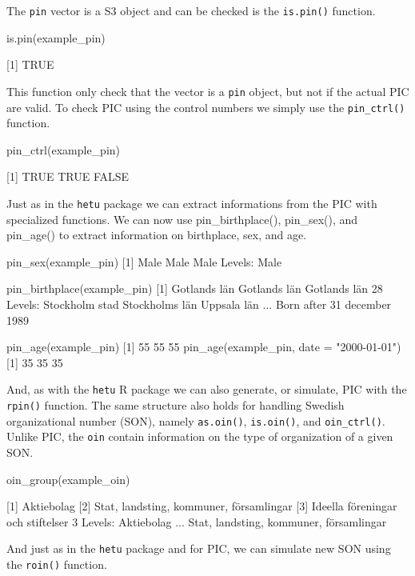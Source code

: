 The \texttt{pin} vector is a S3 object and can be checked is the \texttt{is.pin()} function.

 \begin{example}
   is.pin(example_pin)

   [1] TRUE
 \end{example}

 This function only check that the vector is a \texttt{pin} object, but not if the actual PIC are valid. To check PIC using the control numbers we simply use the \texttt{pin\_ctrl()} function.

 \begin{example}
   pin_ctrl(example_pin)

   [1]  TRUE  TRUE FALSE
 \end{example}

 Just as in the \texttt{hetu} package we can extract informations from the PIC with specialized functions. We can now use pin\_birthplace(), pin\_sex(), and pin\_age() to extract information on birthplace, sex, and age.

 \begin{example}
   pin_sex(example_pin)
   [1] Male Male Male
   Levels: Male

   pin_birthplace(example_pin)
   [1] Gotlands län Gotlands län Gotlands län
   28 Levels: Stockholm stad Stockholms län Uppsala län ... Born after 31 december 1989

   pin_age(example_pin)
   [1] 55 55 55
   pin_age(example_pin, date = "2000-01-01")
   [1] 35 35 35
 \end{example}

 And, as with the \texttt{hetu} R package we can also generate, or simulate, PIC with the \texttt{rpin()} function. The same structure also holds for handling Swedish organizational number (SON), namely \texttt{as.oin()}, \texttt{is.oin()}, and \texttt{oin\_ctrl()}. Unlike PIC, the \texttt{oin} contain information on the type of organization of a given SON.

 \begin{example}
   oin_group(example\_oin)

   [1] Aktiebolag
   [2] Stat, landsting, kommuner, församlingar
   [3] Ideella föreningar och stiftelser
   3 Levels: Aktiebolag ... Stat, landsting, kommuner, församlingar
 \end{example}

 And just as in the \texttt{hetu} package and for PIC, we can simulate new SON using the \texttt{roin()} function.

